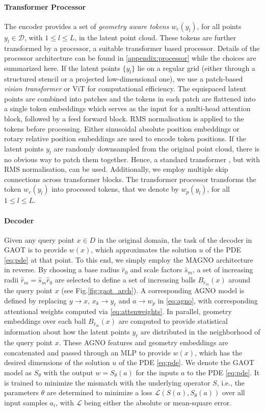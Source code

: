 \documentclass[reqno,10pt]{amsart}
\theoremstyle{plain}
\theoremstyle{definition}
\newcommand{\cal}[1]{\mathcal{#1}}
\begin{document}
\paragraph{\bf Transformer Processor}
The encoder provides a set of {\it geometry aware tokens} $w_e(y_l)$, for all points $y_l \in \cal D$, with $1 \leq l \leq L$, in the latent point cloud. These tokens are further transformed by a processor, a suitable transformer based processor. Details of the processor architecture can be found in \ref{appendix:processor} while the choices are summarized here. If the latent points $\{y_l\}$ lie on a regular grid (either through a structured stencil or a projected low-dimensional one), we use a patch-based {\it vision transformer} or ViT \cite{AD2021} for computational efficiency. The equispaced latent points are combined into patches and the tokens in each patch are flattened into a single token embeddings which serves as the input for a multi-head attention block, followed by a feed forward block. RMS normalisation is applied to the tokens before processing. Either sinusoidal absolute position embeddings or rotary relative position embeddings are used to encode token positions. If the latent points $y_l$ are randomly downsampled from the original point cloud, there is no obvious way to patch them together. Hence, a standard transformer \cite{AV2017}, but with RMS normalisation, can be used. Additionally, we employ multiple skip connections across transformer blocks. The transformer processor transforms the token $w_e(y_l)$ into processed tokens, that we denote by $w_p(y_l)$, for all $ 1 \leq l \leq L$.

\paragraph{\bf Decoder} Given any query point $x \in D$ in the original domain, the task of the decoder in GAOT is to provide $w(x)$, which approximates the solution $u$ of the PDE \ref{eq:pde} at that point. To this end, we simply employ the MAGNO architecture in reverse. By choosing a base radius $\hat{r}_0$ and scale factors $\hat{s}_m$, a set of increasing radii $\hat{r}_m = \hat{s}_m \hat{r}_0$ are selected to define a set of increasing balls $B_{\hat{r}_m}(x)$ around the query point $x$ (see Fig.\ref{fig:gaot_arch}). A corresponding AGNO model is defined by replacing $y \rightarrow x$, $x_k \rightarrow y_\ell$ and $a \rightarrow w_p$ in \ref{eq:agno}, with corresponding attentional weights computed via \ref{eq:attenweights}. In parallel, geometry embeddings over each ball $B_{\hat{r}_m}(x)$ are computed to provide statistical information about how the latent points $y_\ell$ are distributed in the neighborhood of the query point $x$. These AGNO features and geometry embeddings are concatenated and passed through an MLP to provide $w(x)$, which has the desired dimensions of the solution $u$ of the PDE \ref{eq:pde}. We denote the GAOT model as $S_\theta$ with the output $w = S_\theta(a)$ for the inputs $a$ to the PDE \ref{eq:pde}. It is trained to minimize the mismatch with the underlying operator $S$, i.e., the parameters $\theta$ are determined to minimize a loss $\mathcal{L}(S(a), S_\theta(a))$ over all input samples $a_i$, with $\mathcal{L}$ being either the absolute or mean-square error.
\end{document}

